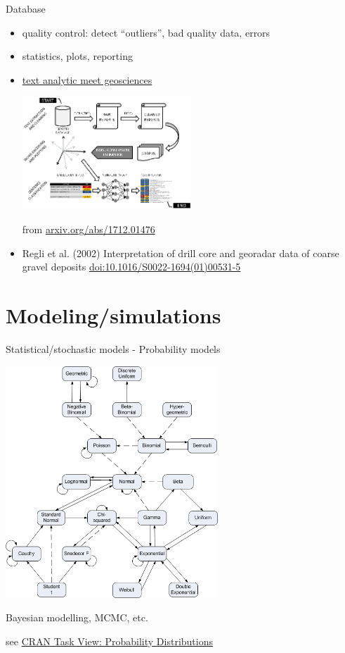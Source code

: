 \documentclass[8pt,ignorenonframetext,]{beamer}
\begin{document}
\begin{frame}{Database}

\begin{itemize}
\item
  quality control: detect ``outliers'', bad quality data, errors
\item
  statistics, plots, reporting
\item
  \href{https://paulhcleverley.com/2017/05/28/text-analytics-meets-geoscience/}{text
  analytic meet geosciences}

  \includegraphics[width=0.50000\textwidth]{imgPres/text_analyse_drilling_report.png}

  from \href{https://arxiv.org/abs/1712.01476}{arxiv.org/abs/1712.01476}
\item
  Regli et al. (2002) Interpretation of drill core and georadar data of
  coarse gravel deposits
  \href{https://doi.org/10.1016/S0022-1694(01)00531-5}{doi:10.1016/S0022-1694(01)00531-5}
\end{itemize}

\end{frame}

\section{Modeling/simulations}\label{modelingsimulations}

\begin{frame}{Statistical/stochastic models - Probability models}

\includegraphics[width=0.60000\textwidth]{imgPres/distribution_chart.png}

Bayesian modelling, MCMC, etc.

see \href{https://cran.r-project.org/web/views/Distributions.html}{CRAN
Task View: Probability Distributions}

\end{frame}
\end{document}

